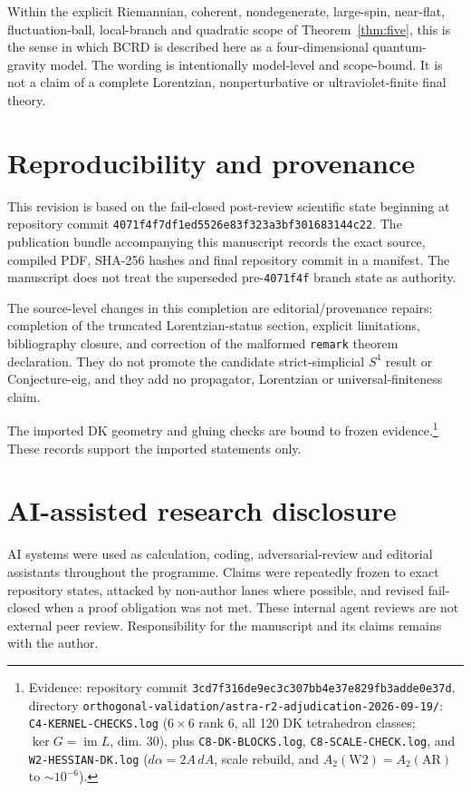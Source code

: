 \documentclass[11pt]{article}
\numberwithin{equation}{section}
\begin{document}
Within the explicit Riemannian, coherent, nondegenerate, large-spin, near-flat, fluctuation-ball, local-branch and quadratic scope of Theorem~\ref{thm:five}, this is the sense in which BCRD is described here as a four-dimensional quantum-gravity model. The wording is intentionally model-level and scope-bound. It is not a claim of a complete Lorentzian, nonperturbative or ultraviolet-finite final theory.

\section*{Reproducibility and provenance}

This revision is based on the fail-closed post-review scientific state beginning at repository commit
\texttt{4071f4f7df1ed5526e83f323a3bf301683144c22}. The publication bundle accompanying this manuscript records the exact source, compiled PDF, SHA-256 hashes and final repository commit in a manifest. The manuscript does not treat the superseded pre-\texttt{4071f4f} branch state as authority.

The source-level changes in this completion are editorial/provenance repairs: completion of the truncated Lorentzian-status section, explicit limitations, bibliography closure, and correction of the malformed \texttt{remark} theorem declaration. They do not promote the candidate strict-simplicial $S^4$ result or Conjecture-eig, and they add no propagator, Lorentzian or universal-finiteness claim.

The imported DK geometry and gluing checks are bound to frozen evidence.\footnote{Evidence: repository commit \texttt{3cd7f316de9ec3c307bb4e37e829fb3adde0e37d}, directory \texttt{orthogonal-validation/astra-r2-adjudication-2026-09-19/}: \texttt{C4-KERNEL-CHECKS.log} ($6\times6$ rank $6$, all 120 DK tetrahedron classes; $\ker G=\operatorname{im}L$, dim. 30), plus \texttt{C8-DK-BLOCKS.log}, \texttt{C8-SCALE-CHECK.log}, and \texttt{W2-HESSIAN-DK.log} ($d\alpha=2A\,dA$, scale rebuild, and $A_2(\mathrm{W2})=A_2(\mathrm{AR})$ to $\sim10^{-6}$).} These records support the imported statements only.

\section*{AI-assisted research disclosure}

AI systems were used as calculation, coding, adversarial-review and editorial assistants throughout the programme. Claims were repeatedly frozen to exact repository states, attacked by non-author lanes where possible, and revised fail-closed when a proof obligation was not met. These internal agent reviews are not external peer review. Responsibility for the manuscript and its claims remains with the author.
\end{document}
